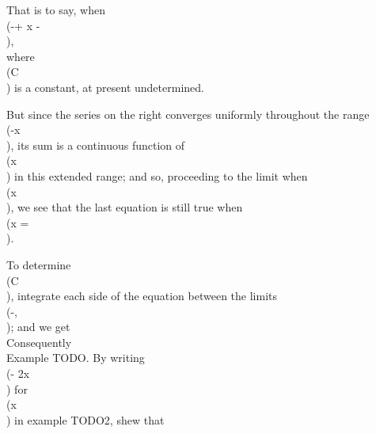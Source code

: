 That is to say, when \\(-\pi + \delta \leq x \leq \pi - \delta\\),
\\[ 
C - \frac{1}{4} x^{2}
=
\sum_{n=1}^{\infty} \frac{(-)^{n-1} \cos nx}{n^{2}},
\\] 
where \\(C\\) is a constant, at present undetermined.

But since the series on the right converges uniformly throughout the
range \\(-\pi \leq x \leq \pi\\), its sum is a continuous function of \\(x\\) in this
extended range; and so, proceeding to the limit when
\\(x \rightarrow \pm \pi\\), we see
that the last equation is still true when \\(x = \pm \pi\\).

To determine \\(C\\), integrate each side of the equation  between
the limits \\(-\pi, \pi\\); and we get
\\[ 
2 \pi C - \frac{1}{6} \pi^{3} = 0.
\\] 

Consequently
\\[ 
\frac{1}{12} \pi^{2} - \frac{1}{4} x^{2}
=
\sum_{n=1}^{\infty}
\frac{ (-)^{n-1} \cos nx }{ n^{2} }
\quad
(-\pi \leq x \leq \pi).
\\] 

Example TODO.
By writing \\(\pi - 2x\\) for \\(x\\) in example TODO2, shew that
\\[ 
\sum_{n=1}^{\infty} \frac{\sin^{2} nx}{n^{2}}
=
\begin{cases}
  \frac{1}{2} x (\pi - x)                         & 0 \leq x \leq \pi,   \\
  \frac{1}{2} \left\{  \pi \left| \, x \, \right|  - x^{2}\right\} & -\pi \leq x \leq \pi.
\end{cases}
\\] 

